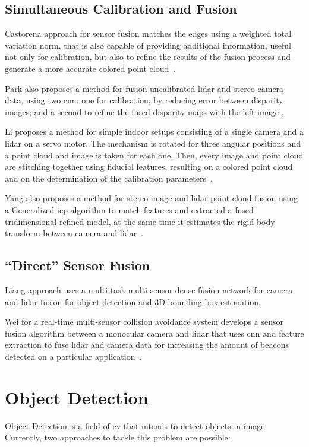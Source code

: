 \subsection{Simultaneous Calibration and Fusion}
Castorena \etal approach for sensor fusion matches the edges using a weighted total variation norm, that is also capable of providing additional information, useful not only for calibration, but also to refine the results of the fusion process and generate a more accurate colored point cloud~\cite{Castorena2016}.

Park \etal also proposes a method for fusion uncalibrated \ac{lidar} and stereo camera data, using two \ac{cnn}: one for calibration, by reducing error between disparity images; and a second to refine the fused disparity maps with the left image \cite{Park2019}. 

Li \etal proposes a method for simple indoor setups consisting of a single camera and a \ac{lidar} on a servo motor. The mechanism is rotated for three angular positions and a point cloud and image is taken for each one. Then, every image and point cloud are stitching together using fiducial features, resulting on a colored point cloud and on the determination of the calibration parameters~\cite{Li2016}. 

Yang \etal also proposes a method for stereo image and \ac{lidar} point cloud fusion using a Generalized \acl{icp} algorithm to match features and extracted a fused tridimensional refined model, at the same time it estimates the rigid body transform between camera and \ac{lidar}~\cite{Yang2017}.


\subsection{``Direct'' Sensor Fusion}
Liang \etal approach uses a multi-task multi-sensor dense fusion network for camera and \ac{lidar} fusion for object detection and 3D bounding box estimation.

Wei \etal for a real-time multi-sensor collision avoidance system develops a sensor fusion algorithm between a monocular camera and \ac{lidar} that uses \ac{cnn} and feature extraction to fuse \ac{lidar} and camera data for increasing the amount of beacons detected on a particular application~\cite{Wei2018}.


\section{Object Detection}
Object Detection is a field of \acl{cv} that intends to detect objects in image. Currently, two approaches to tackle this problem are possible:

